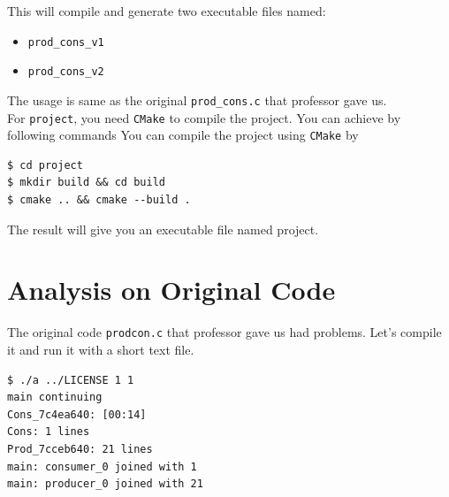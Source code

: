 \documentclass{homework}
\begin{document}
This will compile and generate two executable files named:
\begin{itemize}
   \item \texttt{prod_cons_v1}
   \item \texttt{prod_cons_v2}
\end{itemize}

The usage is same as the original \texttt{prod_cons.c} that professor gave us.
\\
For \texttt{project}, you need \texttt{CMake} to compile the project. You can achieve by following commands
You can compile the project using \texttt{CMake} by
\\
\begin{center}
\begin{code}
\begin{verbatim}
$ cd project
$ mkdir build && cd build
$ cmake .. && cmake --build .
\end{verbatim}
\end{code}
\end{center}
The result will give you an executable file named project.
\par


\pagebreak

\section{Analysis on Original Code} 
The original code \texttt{prod\textunderscore con.c} that professor gave us had problems. Let's compile it and run it with a short text file.
\\
\begin{center}
\begin{code}
\begin{verbatim}
$ ./a ../LICENSE 1 1
main continuing
Cons_7c4ea640: [00:14]
Cons: 1 lines
Prod_7cceb640: 21 lines
main: consumer_0 joined with 1
main: producer_0 joined with 21
\end{verbatim}
\end{code}
\end{center}
\end{document}
